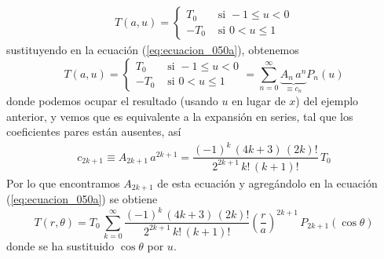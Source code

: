\begin{align*}
T(a, u) = 
\begin{cases}
T_{0} & \text{ si } -1 \leq u < 0 \\
-T_{0} & \text{ si } 0 < u \leq 1 
\end{cases}
\end{align*}
sustituyendo en la ecuación (\ref{eq:ecuacion_050a}), obtenemos
\begin{equation} 
T(a, u) = 
\begin{cases}
T_{0} & \text{ si } -1 \leq u < 0 \\
-T_{0} & \text{ si } 0 < u \leq 1 
\end{cases} =
\sum_{n=0}^{\infty} \underbrace{A_{n} \, a^{n}}_{\equiv c_{n}} P_{n}(u)
\label{eq:ecuacion_051a}
\end{equation}
donde podemos ocupar el resultado (usando $u$ en lugar de $x$) del ejemplo anterior, y vemos que es equivalente a la expansión en series, tal que los coeficientes pares están ausentes, así
\begin{align*}
c_{2k+1} \equiv A_{2k+1} \, a^{2k+1} = \dfrac{(-1)^{k} \, (4k+3) \, (2k)!}{2^{2k+1} \, k! \, (k+1)!} \, T_{0}
\end{align*}
Por lo que encontramos $A_{2k+1}$ de esta ecuación y agregándolo en la ecuación (\ref{eq:ecuacion_050a}) se obtiene
\begin{equation}
T(r, \theta) = T_{0} \, \sum_{k=0}^{\infty} \dfrac{(-1)^{k} \, (4k+3) \, (2k)!}{2^{2k+1} \, k! \, (k+1)!} \left( \dfrac{r}{a} \right)^{2k+1} \, P_{2k+1} (\cos \theta)
\label{eq:ecuacion_052a}
\end{equation}
donde se ha sustituido $\cos \theta$ por $u$.
